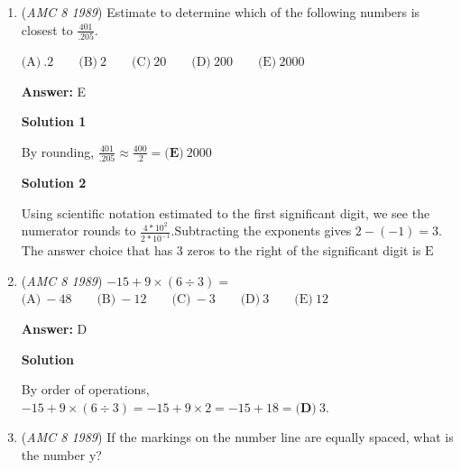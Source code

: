 \begin{enumerate}
 



\textbf{Solution 2}

The answer choices sorted from largest to smallest are $.99>.9099>.909>.9009>.9$, so choice $\boxed{\textbf{(A)}\ .99}$ is the largest.

 



\textbf{Solution 3}

If $.9$ is subtracted from each answer choice, the answer choices become $.09$, $.0099$, $0$, $.009$, and $.0009$.  Of these, all except $.09$ are less than $.01$, so $\boxed{\textbf{(A)}\ .99}$ is the largest.

 


	\item (\textit{AMC 8 1989}) Estimate to determine which of the following numbers is closest to $\frac{401}{.205}$.


 $\text{(A)}\ .2 \qquad \text{(B)}\ 2 \qquad \text{(C)}\ 20 \qquad \text{(D)}\ 200 \qquad \text{(E)}\ 2000$

 \textbf{Answer: }E



\textbf{Solution 1}

By rounding, $\frac{401}{.205} \approx \frac{400}{.2}=\boxed{\textbf{(E)}\ 2000}$




\textbf{Solution 2}

Using scientific notation estimated to the first significant digit, we see the numerator rounds to $\frac{4*10^2}{2*10^{-1}}$.Subtracting the exponents gives $2-(-1)=3$. The answer choice that has $3$ zeros to the right of the significant digit is $\boxed{\text{E}}$



	\item (\textit{AMC 8 1989}) $-15+9\times (6\div 3) =$
$\text{(A)}\ -48 \qquad \text{(B)}\ -12 \qquad \text{(C)}\ -3 \qquad \text{(D)}\ 3 \qquad \text{(E)}\ 12$

 \textbf{Answer: }D



\textbf{Solution}

By order of operations, $-15+9\times (6\div 3) = -15+9\times 2 = -15+18 = \boxed{\textbf{(D)}\ 3}$.

 


	\item (\textit{AMC 8 1989}) If the markings on the number line are equally spaced, what is the number $\text{y}$?



\end{enumerate}
